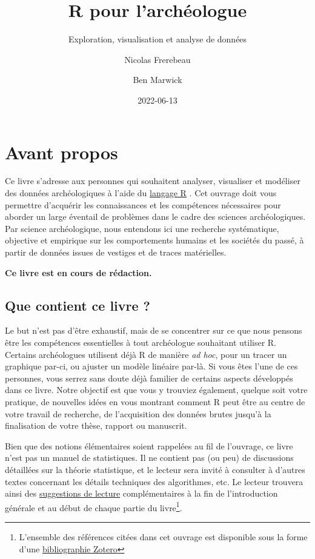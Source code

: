 \documentclass[
  french,
]{scrbook}
\title{R pour l'archéologue}
\subtitle{Exploration, visualisation et analyse de données}
\author{Nicolas Frerebeau \and Ben Marwick}
\date{2022-06-13}
\begin{document}
\maketitle

\frontmatter

{
\setcounter{tocdepth}{1}
\tableofcontents
}
\hypertarget{avant-propos}{%
\chapter*{Avant propos}\label{avant-propos}}

Ce livre s'adresse aux personnes qui souhaitent analyser, visualiser et modéliser des données archéologiques à l'aide du \href{https://www.r-project.org/}{langage R} \autocite{R-base}. Cet ouvrage doit vous permettre d'acquérir les connaissances et les compétences nécessaires pour aborder un large éventail de problèmes dans le cadre des sciences archéologiques. Par science archéologique, nous entendons ici une recherche systématique, objective et empirique sur les comportements humains et les sociétés du passé, à partir de données issues de vestiges et de traces matérielles.

\textbf{Ce livre est en cours de rédaction.}

\hypertarget{que-contient-ce-livre}{%
\section*{Que contient ce livre ?}\label{que-contient-ce-livre}}

Le but n'est pas d'être exhaustif, mais de se concentrer sur ce que nous pensons être les compétences essentielles à tout archéologue souhaitant utiliser R. Certains archéologues utilisent déjà R de manière \emph{ad hoc}, pour un tracer un graphique par-ci, ou ajuster un modèle linéaire par-là. Si vous êtes l'une de ces personnes, vous serrez sans doute déjà familier de certains aspects développés dans ce livre. Notre objectif est que vous y trouviez également, quelque soit votre pratique, de nouvelles idées en vous montrant comment R peut être au centre de votre travail de recherche, de l'acquisition des données brutes jusqu'à la finalisation de votre thèse, rapport ou manuscrit.

Bien que des notions élémentaires soient rappelées au fil de l'ouvrage, ce livre n'est pas un manuel de statistiques. Il ne contient pas (ou peu) de discussions détaillées sur la théorie statistique, et le lecteur sera invité à consulter à d'autres textes concernant les détails techniques des algorithmes, etc. Le lecteur trouvera ainsi des \protect\hyperlink{ressources-compluxe9mentaires}{suggestions de lecture} complémentaires à la fin de l'introduction générale et au début de chaque partie du livre\footnote{L'ensemble des références citées dans cet ouvrage est disponible sous la forme d'une \href{https://www.zotero.org/groups/4507200/rarcheo/library}{bibliographie Zotero}}.
\end{document}
